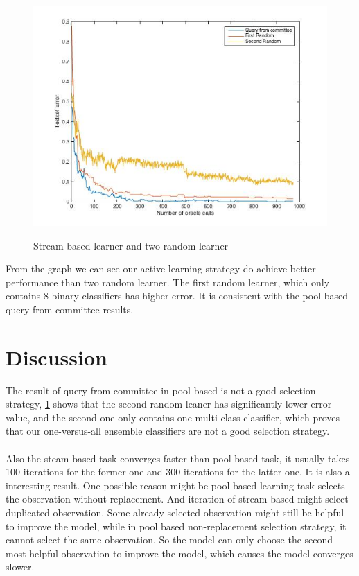 \documentclass{article}
\begin{document}
\begin{figure}[H]
\centering
\includegraphics[scale=0.5]{stream-based-overall-result} \label{stream-based-result}
\caption{Stream based learner and two random learner}
\end{figure}

From the graph we can see our active learning strategy do achieve better performance than two random learner. The first random learner, which only contains 8 binary classifiers has higher error. It is consistent with the pool-based query from committee results.

\section{Discussion}
The result of query from committee in pool based is not a good selection strategy,  \ref{stream-based-result} shows that the second random leaner has significantly lower error value, and the second one only contains one multi-class classifier, which proves that our one-versus-all ensemble classifiers are not a good selection strategy.
\\
\\
Also the steam based task converges faster than pool based task, it usually takes 100 iterations for the former one and 300 iterations for the latter one. It is also a interesting result. One possible reason might be pool based learning task selects the observation without replacement. And iteration of stream based might select duplicated observation. Some already selected observation might still be helpful to improve the model, while in pool based non-replacement selection strategy, it cannot select the same observation. So the model can only choose the second most helpful observation to improve the model, which causes the model converges slower.
\end{document}
